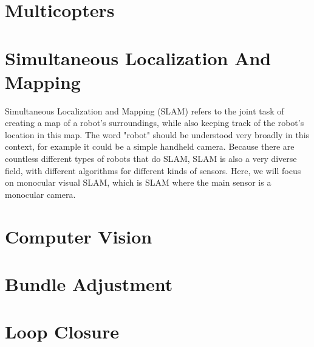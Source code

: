 \section{Multicopters}

\section{Simultaneous Localization And Mapping}
Simultaneous Localization and Mapping (SLAM) refers to the joint task of creating a map of a robot's surroundings, while also keeping track of the robot's location in this map. The word "robot" should be understood very broadly in this context, for example it could be a simple handheld camera. Because there are countless different types of robots that do SLAM, SLAM is also a very diverse field, with different algorithms for different kinds of sensors. Here, we will focus on monocular visual SLAM, which is SLAM where the main sensor is a monocular camera.

\section{Computer Vision}

\section{Bundle Adjustment}

\section{Loop Closure}
